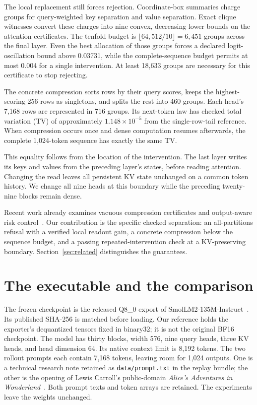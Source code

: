 \documentclass[10pt]{article}
\theoremstyle{definition}\newtheorem{definition}[theorem]{Definition}
\begin{document}
The local replacement still forces rejection. Coordinate-box summaries charge groups for query-weighted key separation and value separation. Exact clique witnesses convert these charges into nine convex, decreasing lower bounds on the attention certificates. The tenfold budget is $\lfloor64{,}512/10\rfloor=6{,}451$ groups across the final layer. Even the best allocation of those groups forces a declared logit-oscillation bound above 0.03731, while the complete-sequence budget permits at most 0.004 for a single intervention. At least 18,633 groups are necessary for this certificate to stop rejecting.

The concrete compression sorts rows by their query scores, keeps the highest-scoring 256 rows as singletons, and splits the rest into 460 groups. Each head's 7,168 rows are represented in 716 groups. Its next-token law has checked total variation (TV) of approximately $1.148\times10^{-5}$ from the single-row-tail reference. When compression occurs once and dense computation resumes afterwards, the complete 1,024-token sequence has exactly the same TV.

This equality follows from the location of the intervention. The last layer writes its keys and values from the preceding layer's states, before reading attention. Changing the read leaves all persistent KV state unchanged on a common token history. We change all nine heads at this boundary while the preceding twenty-nine blocks remain dense.

Recent work already examines vacuous compression certificates and output-aware risk control~\citep{pricingrisk,riskkv}. Our contribution is the specific checked separation: an all-partitions refusal with a verified local readout gain, a concrete compression below the sequence budget, and a passing repeated-intervention check at a KV-preserving boundary. Section~\ref{sec:related} distinguishes the guarantees.

\section{The executable and the comparison}
\label{sec:executable}
The frozen checkpoint is the released Q8\_0 export of SmolLM2-135M-Instruct~\citep{smollm,smollmcard,ggufrelease}. Its published SHA-256 is matched before loading. Our reference holds the exporter's dequantized tensors fixed in binary32; it is not the original BF16 checkpoint. The model has thirty blocks, width 576, nine query heads, three KV heads, and head dimension 64. Its native context limit is 8,192 tokens. The two rollout prompts each contain 7,168 tokens, leaving room for 1,024 outputs. One is a technical research note retained as \texttt{data/prompt.txt} in the replay bundle; the other is the opening of Lewis Carroll's public-domain \emph{Alice's Adventures in Wonderland}~\citep{alice}. Both prompt texts and token arrays are retained. The experiments leave the weights unchanged.
\end{document}
